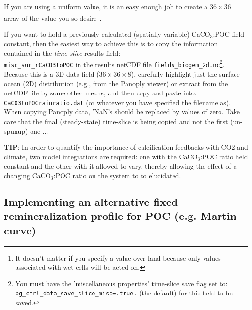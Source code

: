 \documentclass[10pt,twoside]{article}
\begin{document}
If you are using a uniform value, it is an easy enough job to create a \begin{math}36\times36\end{math} array of the value you so desire\footnote{It doesn't matter if you specify a value over land because only values associated with wet cells will be acted on.}.

If you want to hold a previously-calculated (spatially variable) CaCO\begin{math}_3\end{math}:POC field constant, then the easiest way to achieve this is to copy the information contained in the \textit{time-slice} results field:\\
\texttt{misc\_sur\_rCaCO3toPOC} in the results netCDF file \texttt{fields\_biogem\_2d.nc}\footnote{You must have the 'miscellaneous properties' time-slice save flag set to:\\
\texttt{bg\_ctrl\_data\_save\_slice\_misc=.true.} (the default) for this field to be saved.}. Because this is a 3D data field (\begin{math}36\times36\times8\end{math}), carefully highlight just the surface ocean (2D) distribution (e.g., from the Panoply viewer) or extract from the netCDF file by some other means, and then copy and paste into:\\
\texttt{CaCO3toPOCrainratio.dat} (or whatever you have specified the filename as). When copying Panoply data, 'NaN's should be replaced by values of zero. Take care that the final (steady-state) time-slice is being copied and not the first (un-spunup) one ...

\textbf{TIP}: In order to quantify the importance of calcification feedbacks with CO2 and climate, two model integrations are required: one with the CaCO\begin{math}_3\end{math}:POC ratio held constant and the other with it allowed to vary, thereby allowing the effect of a changing CaCO\begin{math}_3\end{math}:POC ratio on the system to to elucidated.


\subsection{Implementing an alternative fixed remineralization profile for POC (e.g. Martin curve)}\label{fixedremin}
\end{document}
